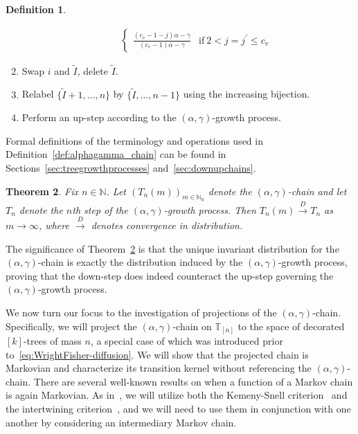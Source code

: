 \documentclass[a4paper, final]{amsart}
\theoremstyle{plain}
\newtheorem{thm}{Theorem}[section]
\theoremstyle{definition}
\newtheorem{defi}[thm]{Definition}
\newcommand{\T}{\mathbb{T}}
\newcommand{\nin}{{n \in \mathbb{N}}}
\newcommand{\dcon}{\xrightarrow{D}}
\newcommand{\N}{\mathbb{N}}
\begin{document}
\begin{defi}
\begin{enumerate}
\begin{itemize}[leftmargin=.5cm]
\begin{align*}
\begin{cases}
              \frac{(c_v - 1 - j)\alpha - \gamma}{(c_v - 1)\alpha - \gamma} & \text{if}\ 2 < j = j^\prime \leq c_v
            \end{cases}
          \end{align*}
      \end{itemize}
    \item Swap $i$ and $\tilde{I}$, delete $\tilde{I}$.
    \item Relabel $\{\tilde{I} + 1, \ldots, n\}$ by $\{\tilde{I}, \ldots, n-1\}$ using the increasing bijection.
    \item Perform an up-step according to the $(\alpha, \gamma)$-growth process.
  \end{enumerate}
\end{defi}
%
Formal definitions of the terminology and operations used in Definition~\ref{def:alphagamma_chain} can be found in Sections~\ref{sec:treegrowthprocesses} and~\ref{sec:downupchains}.
%
\begin{thm}\label{thm:nonplanarstationarity}
  Fix $\nin$.
  Let ${\left( T_n(m) \right)}_{m \in \N_0}$ denote the $(\alpha, \gamma)$-chain and let $T_n$ denote the $n$th step of the $(\alpha, \gamma)$-growth process.
  Then $T_n(m) \dcon T_n$ as $m \to \infty$, where $\dcon$ denotes convergence in distribution.
\end{thm}
%
The significance of Theorem~\ref{thm:nonplanarstationarity} is that the unique invariant distribution for the $(\alpha, \gamma)$-chain is exactly the distribution induced by the $(\alpha, \gamma)$-growth process, proving that the down-step does indeed counteract the up-step governing the $(\alpha, \gamma)$-growth process.

We now turn our focus to the investigation of projections of the $(\alpha, \gamma)$-chain.
Specifically, we will project the $(\alpha, \gamma)$-chain on $\T_{[n]}$ to the space of decorated $[k]$-trees of mass $n$, a special case of which was introduced prior to~\eqref{eq:WrightFisher-diffusion}.
We will show that the projected chain is Markovian and characterize its transition kernel without referencing the $(\alpha, \gamma)$-chain.
There are several well-known results on when a function of a Markov chain is again Markovian.
As in~\cite{forman2018projections}, we will utilize both the Kemeny-Snell criterion~\cite{MR0115196} and the intertwining criterion~\cite{MR624684}, and we will need to use them in conjunction with one another by considering an intermediary Markov chain.
\end{document}
